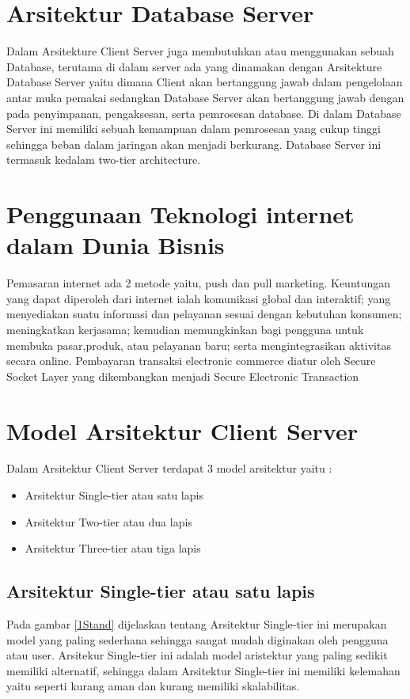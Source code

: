 {\section{Arsitektur Database Server}
Dalam Arsitekture Client Server juga membutuhkan atau menggunakan sebuah Database, terutama di dalam server ada yang
dinamakan dengan Arsitekture Database Server yaitu dimana Client akan bertanggung jawab dalam pengelolaan antar muka pemakai
sedangkan Database Server akan bertanggung jawab dengan pada penyimpanan, pengaksesan, serta pemrosesan database.
Di dalam Database Server ini memiliki sebuah kemampuan dalam pemrosesan yang cukup tinggi sehingga beban dalam jaringan akan 
menjadi berkurang. Database Server ini termasuk kedalam two-tier architecture.

\section {Penggunaan Teknologi internet dalam Dunia Bisnis}
Pemasaran internet ada 2 metode yaitu, push dan pull marketing. Keuntungan yang dapat diperoleh dari internet ialah komunikasi global dan interaktif; yang menyediakan suatu informasi dan pelayanan sesuai dengan kebutuhan konsumen; meningkatkan kerjasama; kemudian memungkinkan bagi pengguna untuk membuka pasar,produk, atau pelayanan baru; serta mengintegrasikan aktivitas secara online. 
Pembayaran transaksi electronic commerce diatur oleh Secure Socket Layer yang dikembangkan menjadi Secure Electronic Transaction

\section{Model Arsitektur Client Server}
Dalam Arsitektur Client Server terdapat 3 model arsitektur yaitu :

	\begin{itemize}
	\item Arsitektur Single-tier atau satu lapis
	\item Arsitektur Two-tier atau dua lapis
	\item Arsitektur Three-tier atau tiga lapis
	\end{itemize}

\subsection{Arsitektur Single-tier atau satu lapis}
Pada gambar \ref{1Stand} dijelaskan tentang Arsitektur Single-tier ini merupakan model yang paling sederhana sehingga sangat mudah diginakan oleh pengguna atau user.
Arsitekur Single-tier ini adalah model aristektur yang paling sedikit memiliki alternatif, sehingga dalam Arsitektur Single-tier ini
memiliki kelemahan yaitu seperti kurang aman dan kurang memiliki skalabilitas.

}
